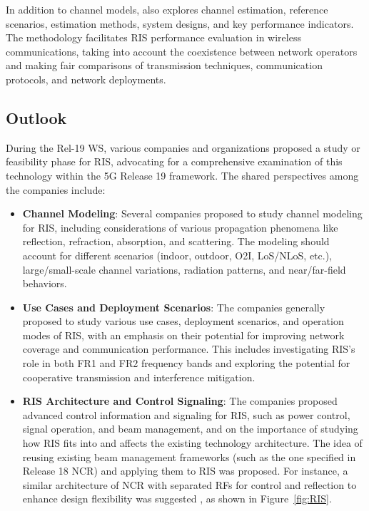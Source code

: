 \documentclass[lettersize,journal]{IEEEtran}
\begin{document}
In addition to channel models, \cite{ETSI-GR-RIS-003} also explores channel estimation, reference scenarios, estimation methods, system designs, and key performance indicators. The methodology facilitates RIS performance evaluation in wireless communications, taking into account the coexistence between network operators and making fair comparisons of transmission techniques, communication protocols, and network deployments.

\subsection{Outlook}

During the Rel-19 WS, various companies and organizations proposed a study or feasibility phase for RIS, advocating for a comprehensive examination of this technology within the 5G Release 19 framework. The shared perspectives among the companies include:
\begin{itemize}
\item \textbf{Channel Modeling}: Several companies proposed to study channel modeling for RIS, including considerations of various propagation phenomena like reflection, refraction, absorption, and scattering. The modeling should account for different scenarios (indoor, outdoor, O2I, LoS/NLoS, etc.), large/small-scale channel variations, radiation patterns, and near/far-field behaviors.

\item \textbf{Use Cases and Deployment Scenarios}: The companies generally proposed to study various use cases, deployment scenarios, and operation modes of RIS, with an emphasis on their potential for improving network coverage and communication performance. This includes investigating RIS's role in both FR1 and FR2 frequency bands and exploring the potential for cooperative transmission and interference mitigation.

\item \textbf{RIS Architecture and Control Signaling}: The companies proposed advanced control information and signaling for RIS, such as power control, signal operation, and beam management, and on the importance of studying how RIS fits into and affects the existing technology architecture. The idea of reusing existing beam management frameworks (such as the one specified in Release 18 NCR) and applying them to RIS was proposed. For instance, a similar architecture of NCR with separated RFs for control and reflection to enhance design flexibility was suggested \cite{Yuan-COMMag22}, as shown in Figure~\ref{fig:RIS}.
\end{itemize}
\end{document}
